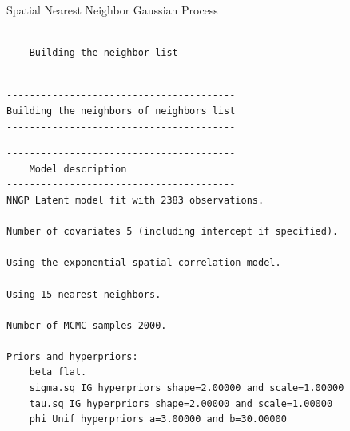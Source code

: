 \documentclass[
  ignorenonframetext,
]{beamer}
\begin{document}
\begin{frame}[fragile]{Spatial Nearest Neighbor Gaussian Process}
\label{spatial-nearest-neighbor-gaussian-process}
\begin{verbatim}
----------------------------------------
    Building the neighbor list
----------------------------------------
\end{verbatim}

\begin{verbatim}
----------------------------------------
Building the neighbors of neighbors list
----------------------------------------
\end{verbatim}

\begin{verbatim}
----------------------------------------
    Model description
----------------------------------------
NNGP Latent model fit with 2383 observations.

Number of covariates 5 (including intercept if specified).

Using the exponential spatial correlation model.

Using 15 nearest neighbors.

Number of MCMC samples 2000.

Priors and hyperpriors:
    beta flat.
    sigma.sq IG hyperpriors shape=2.00000 and scale=1.00000
    tau.sq IG hyperpriors shape=2.00000 and scale=1.00000
    phi Unif hyperpriors a=3.00000 and b=30.00000



\end{verbatim}
\end{frame}
\end{document}
